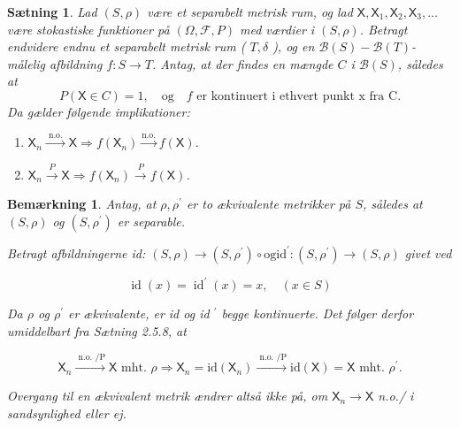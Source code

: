 \documentclass{article}
\newcommand{\1}{\mathbbm{1}}
\newcommand{\X}{\mathsf{X}}
\newtheorem{remark}[theorem]{Bemærkning}
\newtheorem{proposition}[theorem]{Sætning}
\theoremstyle{boxed}
\begin{document}
\begin{theorem-box}
    \begin{proposition}
        Lad $(S, \rho)$ være et separabelt metrisk rum, og lad $\X, \X_1, \X_2, \X_3, \ldots$ være stokastiske funktioner på $(\Omega, \mathcal{F}, P)$ med værdier i $(S, \rho)$.
Betragt endvidere endnu et separabelt metrisk rum ( $T, \delta$ ), og en $\mathcal{B}(S)-\mathcal{B}(T)$-målelig afbildning $f: S \rightarrow T$.
Antag, at der findes en mængde $C$ i $\mathcal{B}(S)$, således at $$P(\X \in C)=1, \quad \text{og}\quad f \text{ er kontinuert i ethvert punkt x fra C}.$$
Da gælder følgende implikationer:
\begin{enumerate}
    \item[\textnormal{(i)}]$\X_n \xrightarrow{\text { n.o. }} \X \Longrightarrow f\left(\X_n\right) \xrightarrow{\text{n.o.}} f(\X)$.
    \item[\textnormal{(ii)}]$\X_n \xrightarrow{P} \X \Longrightarrow f\left(\X_n\right) \xrightarrow{P} f(\X)$.
\end{enumerate}
    \end{proposition}
\end{theorem-box}
\begin{remark}
    Antag, at $\rho, \rho^{\prime}$ er to ækvivalente metrikker på $S$, således at $(S, \rho)$ og $\left(S, \rho^{\prime}\right)$ er separable.

Betragt afbildningerne id: $(S, \rho) \rightarrow\left(S, \rho^{\prime}\right) \circ \mathrm{og} \mathrm{id}^{\prime}:\left(S, \rho^{\prime}\right) \rightarrow(S, \rho)$ givet ved

$$
\operatorname{id}(x)=\operatorname{id}^{\prime}(x)=x, \quad(x \in S)
$$


Da $\rho$ og $\rho^{\prime}$ er ækvivalente, er id og id ${ }^{\prime}$ begge kontinuerte.
Det følger derfor umiddelbart fra Sætning 2.5.8, at

$$
\X_n \xrightarrow{\text { n.o. } / \mathrm{P}} \X \text { mht. } \rho \Longrightarrow \X_n=\mathrm{id}\left(\X_n\right) \xrightarrow{\text { n.o. } / \mathrm{P}} \mathrm{id}(\X)=\X \text { mht. } \rho^{\prime} .
$$


Overgang til en ækvivalent metrik ændrer altså ikke på, om $\X_n \rightarrow \X$ n.o./ i sandsynlighed eller ej.
\end{remark}
\end{document}
